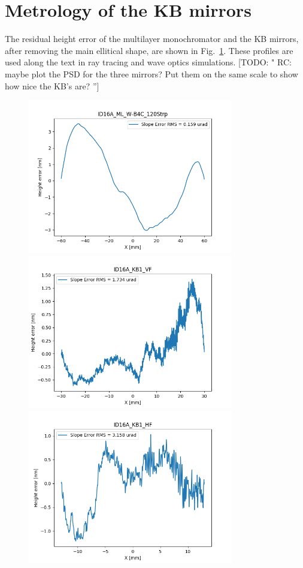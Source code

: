 \documentclass{iucr}              %
\newcommand{\todo}[1]{{\color{red}[TODO: "#1'']}}
\begin{document}
\section{Metrology of the KB mirrors}
\label{appendix:metrology}
The residual height error of the multilayer monochromator and the KB mirrors, after removing the main ellitical shape, are shown in Fig.~\ref{fig:metrology}. These profiles are used along the text in ray tracing and wave optics simulations.
\todo{
RC: maybe plot the PSD for the three mirrors? Put them on the same scale to show how nice the KB's are?
 }
\begin{figure}\label{fig:metrology}
\includegraphics[width=0.8\textwidth]{GRAPHICS/ID16A_ML_W-B4C_120Strp.png}
\includegraphics[width=0.8\textwidth]{GRAPHICS/ID16A_KB1_VF.png}
\includegraphics[width=0.8\textwidth]{GRAPHICS/ID16A_KB1_HF.png}

\end{figure}
\end{document}
